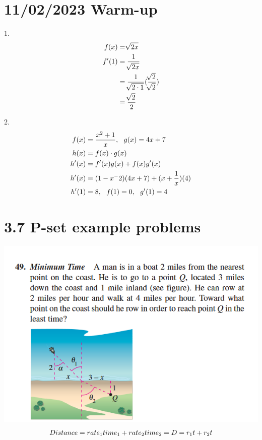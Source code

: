 \documentclass[11pt]{article}
\newcommand*{\set}{\setcounter{equation}{0}}
\begin{document}
\section{11/02/2023 Warm-up}
1.\begin{align}
    \set
    f(x)&=\sqrt[]{2x}\\
    f'(1)&=\frac{1}{\sqrt[]{2x}}\\
    &=\frac{1}{\sqrt[]{2\cdot 1}}(\frac{\sqrt[]{2}}{\sqrt[]{2}})\\
    &=\frac{\sqrt[]{2}}{2}
\end{align}

2.\begin{align}
    \set
    f(x)&=\frac{x^2+1}{x},\,\,\,\, g(x)=4x+7\\
    h(x)&=f(x)\cdot g(x)\\
    h'(x)&=f'(x)g(x)+f(x)g'(x)\\
    h'(x)&=(1-x^-2)(4x+7)+(x+\frac{1}{x})(4)\\
    h'(1)&=8,\,\,\,\, f(1)=0,\,\,\,\, g'(1)=4
\end{align}

\section{3.7 P-set example problems}
\includegraphics{49.png}
\begin{align}
    \set
    Distance=rate_1time_1+rate_2time_2=D=r_1t+r_2t\\
\end{align}
\end{document}
